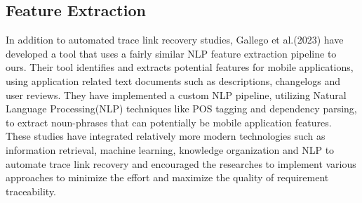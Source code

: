\subsection{Feature Extraction}
In addition to automated trace link recovery studies, Gallego et al.(2023)\cite{Marf2023TransFeatExAN} have developed a tool that uses a fairly similar NLP feature extraction pipeline to ours. Their tool identifies and extracts potential features for mobile applications, using application related text documents such as descriptions, changelogs and user reviews. They have implemented a custom NLP pipeline, utilizing Natural Language Processing(NLP) techniques like POS tagging and dependency parsing, to extract noun-phrases that can potentially be mobile application features.\\

These studies have integrated relatively more modern technologies such as information retrieval, machine learning, knowledge organization and NLP to automate trace link recovery and encouraged the researches to implement various approaches to minimize the effort and maximize the quality of requirement traceability.

